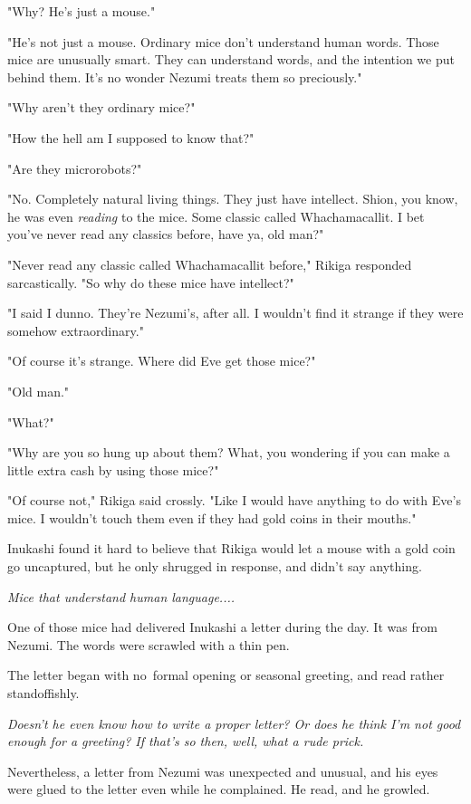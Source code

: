"Why? He's just a mouse."

"He's not just a mouse. Ordinary mice don't understand human words.
Those mice are unusually smart. They can understand words, and the
intention we put behind them. It's no wonder Nezumi treats them so
preciously."

"Why aren't they ordinary mice?"

"How the hell am I supposed to know that?"

"Are they microrobots?"

"No. Completely natural living things. They just have intellect. Shion,
you know, he was even \emph{reading} to the mice. Some classic called
Whachamacallit. I bet you've never read any classics before, have ya,
old man?"

"Never read any classic called Whachamacallit before," Rikiga responded
sarcastically. "So why do these mice have intellect?"

"I said I dunno. They're Nezumi's, after all. I wouldn't find it strange
if they were somehow extraordinary."

"Of course it's strange. Where did Eve get those mice?"

"Old man."

"What?"

"Why are you so hung up about them? What, you wondering if you can make
a little extra cash by using those mice?"

"Of course not," Rikiga said crossly. "Like I would have anything to do
with Eve's mice. I wouldn't touch them even if they had gold coins in
their mouths."

Inukashi found it hard to believe that Rikiga would let a mouse with a
gold coin go uncaptured, but he only shrugged in response, and didn't
say anything.

\emph{Mice that understand human language....}

One of those mice had delivered Inukashi a letter during the day. It was
from Nezumi. The words were scrawled with a thin pen.


The letter began with no~formal opening or seasonal greeting, and read
rather standoffishly.

\emph{Doesn't he even know how to write a proper letter? Or does he think I'm
not good enough for a greeting? If that's so then, well, what a rude
prick.}

Nevertheless, a letter from Nezumi was unexpected and unusual, and his
eyes were glued to the letter even while he complained. He read, and he
growled.

